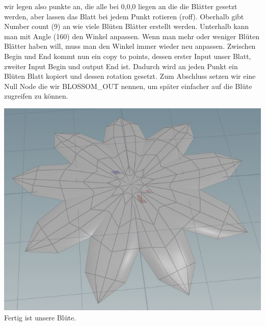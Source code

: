 \begin{​itemize}
wir legen also punkte an, die alle bei 0,0,0 liegen an die die Blätter gesetzt werden, aber lassen das Blatt bei jedem Punkt rotieren (roff). Oberhalb gibt Number count (9) an wie viele Blüten Blätter erstellt werden. Unterhalb kann man mit Angle (160) den Winkel anpassen. Wenn man mehr oder weniger Blüten Blätter haben will, muss man den Winkel immer wieder neu anpassen. 
Zwischen Begin und End kommt nun ein copy to points, dessen erster Input unser Blatt, zweiter Input Begin und output End ist. Dadurch wird an jeden Punkt ein Blüten Blatt kopiert und dessen rotation gesetzt. 
Zum Abschluss setzen wir eine Null Node die wir BLOSSOM_OUT nennen, um später einfacher auf die Blüte zugreifen zu können.  

\includegraphics*[width=\textwidth]{graphics/blossom4.JPG}
Fertig ist unsere Blüte.


\end{​itemize}
